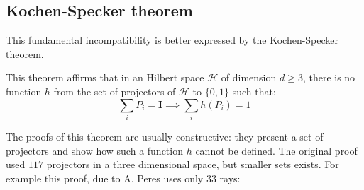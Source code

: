\documentclass[a4paper]{article}
\newcommand{\Hil}{\mathcal{H}}
\newcommand{\I}{\mathbf{I}}
\theoremstyle{definition}
\begin{document}
\subsection{Kochen-Specker theorem}
\label{sec:KS_theorem}
This fundamental incompatibility is better expressed by the Kochen-Specker
theorem.

This theorem affirms that in an Hilbert space $\Hil$ of dimension $d\ge 3$, there is no
function $h$ from the set of projectors of $\Hil$ to $\{0,1\}$ such that:
\begin{equation}
    \sum_i P_i = \I \implies \sum_i h(P_i) = 1 
    \label{eq:KS_function_prop}
\end{equation}

The proofs of this theorem are usually constructive: they present a set of
projectors and show how such a function $h$ cannot be defined.
The original proof used $117$ projectors in a three dimensional space, but
smaller sets exists.
For example this proof, due to A. Peres uses only 33 rays:
\end{document}
